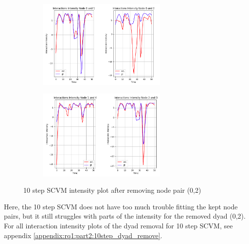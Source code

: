 \begin{figure}[H]
    \centering
    \begin{subfigure}[b]{\textwidth}
        \centering
        \includegraphics[width=0.7\textwidth]{0_images/10step_SCVM_dyad_removal_plot1.png}
    \end{subfigure}
    \hfill
    \begin{subfigure}[b]{\textwidth}
        \centering
        \includegraphics[width=0.7\textwidth]{0_images/10step_SCVM_dyad_removal_plot2.png}
    \end{subfigure}
        \caption{10 step SCVM intensity plot after removing node pair (0,2)}
    \label{fig:RQ1:10step_SCVM_dyadremoval}
\end{figure}
\noindent
Here, the 10 step SCVM does not have too much trouble fitting the kept node pairs, but it still struggles with parts of the intensity for the removed dyad (0,2). 
For all interaction intensity plots of the dyad removal for 10 step SCVM, see appendix \ref{appendix:rq1:part2:10step_dyad_remove}.


